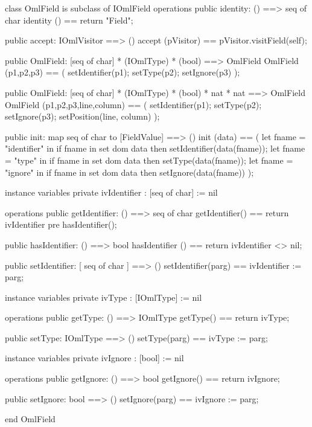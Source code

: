 \begin{vdm_al}
class OmlField is subclass of IOmlField
operations
  public identity: () ==> seq of char
  identity () == return "Field";

  public accept: IOmlVisitor ==> ()
  accept (pVisitor) == pVisitor.visitField(self);

  public OmlField:
    [seq of char] *
    (IOmlType) *
    (bool) ==> OmlField
  OmlField (p1,p2,p3) == 
    ( setIdentifier(p1);
      setType(p2);
      setIgnore(p3) );

  public OmlField:
    [seq of char] *
    (IOmlType) *
    (bool) *
    nat *
    nat ==> OmlField
  OmlField (p1,p2,p3,line,column) == 
    ( setIdentifier(p1);
      setType(p2);
      setIgnore(p3);
      setPosition(line, column) );

  public init: map seq of char to [FieldValue] ==> ()
  init (data) ==
    ( let fname = "identifier" in
        if fname in set dom data
        then setIdentifier(data(fname));
      let fname = "type" in
        if fname in set dom data
        then setType(data(fname));
      let fname = "ignore" in
        if fname in set dom data
        then setIgnore(data(fname)) );

instance variables
  private ivIdentifier : [seq of char] := nil

operations
  public getIdentifier: () ==> seq of char
  getIdentifier() == return ivIdentifier
    pre hasIdentifier();

  public hasIdentifier: () ==> bool
  hasIdentifier () == return ivIdentifier <> nil;

  public setIdentifier: [ seq of char ] ==> ()
  setIdentifier(parg) == ivIdentifier := parg;

instance variables
  private ivType : [IOmlType] := nil

operations
  public getType: () ==> IOmlType
  getType() == return ivType;

  public setType: IOmlType ==> ()
  setType(parg) == ivType := parg;

instance variables
  private ivIgnore : [bool] := nil

operations
  public getIgnore: () ==> bool
  getIgnore() == return ivIgnore;

  public setIgnore: bool ==> ()
  setIgnore(parg) == ivIgnore := parg;

end OmlField
\end{vdm_al}

